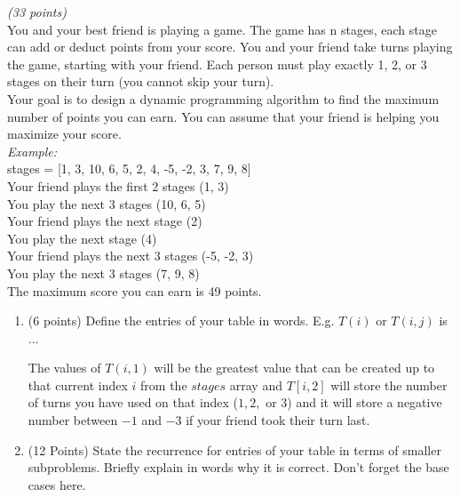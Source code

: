 \documentclass{article}
\newcounter{ProblemCounter}
\newenvironment{problem}[1][Problem]{
 \begin{trivlist}
 \item[\hskip \labelsep {\bfseries #1}\hskip \labelsep {%
 \bfseries \theProblemCounter.%
 \stepcounter{ProblemCounter}%
 }]
}{
 \end{trivlist}
}
\begin{document}
\begin{problem}\textit{(33 points)}\\
You and your best friend is playing a game. The game has n stages, each stage can add or deduct points from your score. You and your friend take turns playing the game, starting with your friend. Each person must play exactly 1, 2, or 3 stages on their turn (you cannot skip your turn).\\

\noindent Your goal is to design a dynamic programming algorithm to find the maximum number of points you can earn. You can assume that your friend is helping you maximize your score.\\

\noindent \textit{Example:}\\
stages = [1, 3, 10, 6, 5, 2, 4, -5, -2, 3, 7, 9, 8]\\

\noindent Your friend plays the first 2 stages (1, 3)\\
You play the next 3 stages (10, 6, 5)\\
Your friend plays the next stage (2)\\
You play the next stage (4)\\
Your friend plays the next 3 stages (-5, -2, 3)\\
You play the next 3 stages (7, 9, 8)\\

\noindent The maximum score you can earn is 49 points.

\begin{enumerate}[label=\textbf{\alph*.)}]
    \item (6 points) Define the entries of your table in words. E.g. $T(i)$ or $T(i, j)$ is ...
    
    The values of $T(i, 1)$ will be the greatest value that can be created up to that current index $i$ from the $stages$ array and $T[i, 2]$ will store the number of turns you have used on that index ($1, 2,$ or $3$) and it will store a negative number between $-1$ and $-3$ if your friend took their turn last.
    
    \item (12 Points) State the recurrence for entries of your table in terms of smaller subproblems. Briefly explain in words why it is correct. Don't forget the base cases here.
    

\end{enumerate}
\end{problem}
\end{document}
